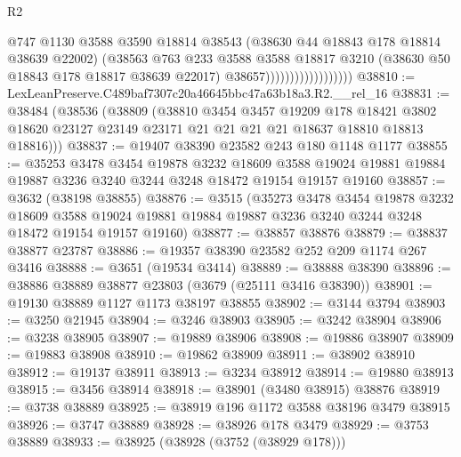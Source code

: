 \begin{lexlean}{R2}
\begin{coremodule}
                                      @747
                                      @1130
                                      @3588
                                      @3590
                                      @18814
                                      @38543
                                      (@38630 @44 @18843 @178 @18814 @38639 @22002)
                                      (@38563
                                        @763
                                        @233
                                        @3588
                                        @3588
                                        @18817
                                        @3210
                                        (@38630 @50 @18843 @178 @18817 @38639 @22017)
                                        @38657))))))))))))))))))
@38810 := LexLeanPreserve.C489baf7307c20a46645bbc47a63b18a3.R2.__rel_16
@38831 := @38484
    (@38536
      (@38809
        (@38810
          @3454
          @3457
          @19209
          @178
          @18421
          @3802
          @18620
          @23127
          @23149
          @23171
          @21
          @21
          @21
          @21
          @18637
          @18810
          @18813
          @18816)))
@38837 := @19407 @38390 @23582 @243 @180 @1148 @1177
@38855 := @35253
    @3478
    @3454
    @19878
    @3232
    @18609
    @3588
    @19024
    @19881
    @19884
    @19887
    @3236
    @3240
    @3244
    @3248
    @18472
    @19154
    @19157
    @19160
@38857 := @3632 (@38198 @38855)
@38876 := @3515
    (@35273
      @3478
      @3454
      @19878
      @3232
      @18609
      @3588
      @19024
      @19881
      @19884
      @19887
      @3236
      @3240
      @3244
      @3248
      @18472
      @19154
      @19157
      @19160)
@38877 := @38857 @38876
@38879 := @38837 @38877 @23787
@38886 := @19357 @38390 @23582 @252 @209 @1174 @267 @3416
@38888 := @3651 (@19534 @3414)
@38889 := @38888 @38390
@38896 := @38886 @38889 @38877 @23803 (@3679 (@25111 @3416 @38390))
@38901 := @19130 @38889 @1127 @1173 @38197 @38855
@38902 := @3144 @3794
@38903 := @3250 @21945
@38904 := @3246 @38903
@38905 := @3242 @38904
@38906 := @3238 @38905
@38907 := @19889 @38906
@38908 := @19886 @38907
@38909 := @19883 @38908
@38910 := @19862 @38909
@38911 := @38902 @38910
@38912 := @19137 @38911
@38913 := @3234 @38912
@38914 := @19880 @38913
@38915 := @3456 @38914
@38918 := @38901 (@3480 @38915) @38876
@38919 := @3738 @38889
@38925 := @38919 @196 @1172 @3588 @38196 @3479 @38915
@38926 := @3747 @38889
@38928 := @38926 @178 @3479
@38929 := @3753 @38889
@38933 := @38925 (@38928 (@3752 (@38929 @178)))

\end{coremodule}
\end{lexlean}
